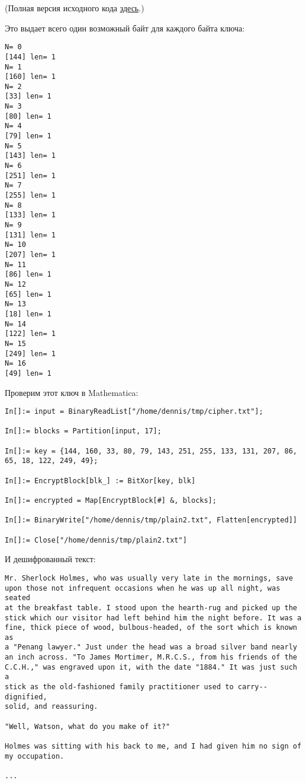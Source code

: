(Полная версия исходного кода \href{https://github.com/DennisYurichev/RE-for-beginners/blob/master/ff/XOR/mask_2/files/decrypt3.py}{здесь}.)

Это выдает всего один возможный байт для каждого байта ключа:

\begin{lstlisting}
N= 0
[144] len= 1
N= 1
[160] len= 1
N= 2
[33] len= 1
N= 3
[80] len= 1
N= 4
[79] len= 1
N= 5
[143] len= 1
N= 6
[251] len= 1
N= 7
[255] len= 1
N= 8
[133] len= 1
N= 9
[131] len= 1
N= 10
[207] len= 1
N= 11
[86] len= 1
N= 12
[65] len= 1
N= 13
[18] len= 1
N= 14
[122] len= 1
N= 15
[249] len= 1
N= 16
[49] len= 1
\end{lstlisting}

Проверим этот ключ в Mathematica:

\begin{lstlisting}[caption=Mathematica,style=custommath]
In[]:= input = BinaryReadList["/home/dennis/tmp/cipher.txt"];

In[]:= blocks = Partition[input, 17];

In[]:= key = {144, 160, 33, 80, 79, 143, 251, 255, 133, 131, 207, 86, 65, 18, 122, 249, 49};

In[]:= EncryptBlock[blk_] := BitXor[key, blk]

In[]:= encrypted = Map[EncryptBlock[#] &, blocks];

In[]:= BinaryWrite["/home/dennis/tmp/plain2.txt", Flatten[encrypted]]

In[]:= Close["/home/dennis/tmp/plain2.txt"]
\end{lstlisting}

И дешифрованный текст:

\begin{lstlisting}
Mr. Sherlock Holmes, who was usually very late in the mornings, save
upon those not infrequent occasions when he was up all night, was seated
at the breakfast table. I stood upon the hearth-rug and picked up the
stick which our visitor had left behind him the night before. It was a
fine, thick piece of wood, bulbous-headed, of the sort which is known as
a "Penang lawyer." Just under the head was a broad silver band nearly
an inch across. "To James Mortimer, M.R.C.S., from his friends of the
C.C.H.," was engraved upon it, with the date "1884." It was just such a
stick as the old-fashioned family practitioner used to carry--dignified,
solid, and reassuring.

"Well, Watson, what do you make of it?"

Holmes was sitting with his back to me, and I had given him no sign of
my occupation.

...
\end{lstlisting}

